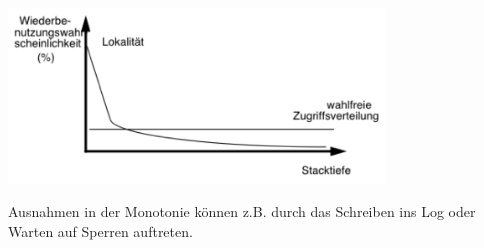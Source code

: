 \begin{enumerate}[a)]
\begin{solution}
\begin{center}
\includegraphics[width = 10cm]{Pictures/Ue07_Aufgabe2_Zusatz2.png}
\end{center}

Ausnahmen in der Monotonie können z.B. durch das Schreiben ins Log oder Warten auf Sperren auftreten.
\end{solution}

%
%


\end{enumerate}
